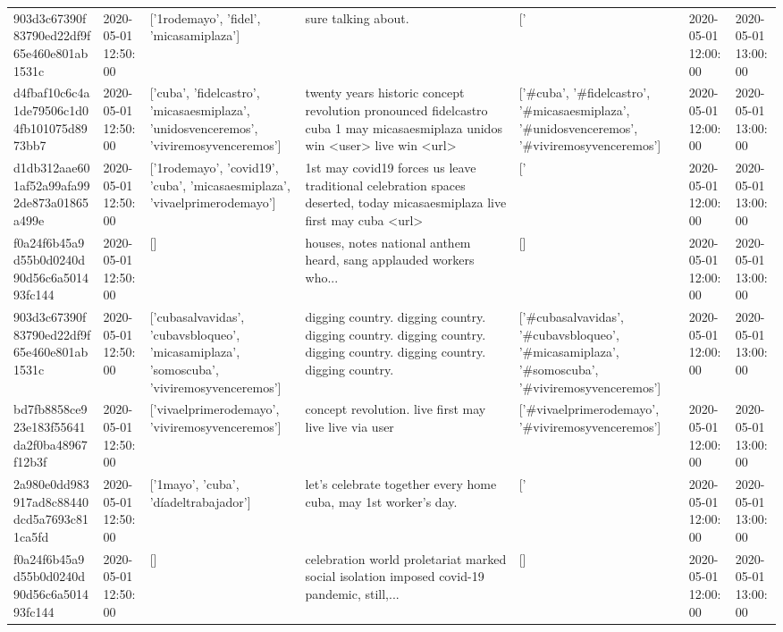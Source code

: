 \begin{tabular}{lllllll}
903d3c67390f83790ed22df9f65e460e801ab1531c & 2020-05-01 12:50:00 & ['1rodemayo', 'fidel', 'micasamiplaza'] & sure talking about. & ['#1rodemayo', '#fidel', '#micasamiplaza'] & 2020-05-01 12:00:00 & 2020-05-01 13:00:00 \\
d4fbaf10c6c4a1de79506c1d04fb101075d8973bb7 & 2020-05-01 12:50:00 & ['cuba', 'fidelcastro', 'micasaesmiplaza', 'unidosvenceremos', 'viviremosyvenceremos'] & twenty years historic concept revolution pronounced fidelcastro cuba 1 may micasaesmiplaza unidos win <user> live win <url> & ['#cuba', '#fidelcastro', '#micasaesmiplaza', '#unidosvenceremos', '#viviremosyvenceremos'] & 2020-05-01 12:00:00 & 2020-05-01 13:00:00 \\
d1db312aae601af52a99afa992de873a01865a499e & 2020-05-01 12:50:00 & ['1rodemayo', 'covid19', 'cuba', 'micasaesmiplaza', 'vivaelprimerodemayo'] & 1st may covid19 forces us leave traditional celebration spaces deserted, today micasaesmiplaza live first may cuba <url> & ['#1rodemayo', '#covid19', '#cuba', '#micasaesmiplaza', '#vivaelprimerodemayo'] & 2020-05-01 12:00:00 & 2020-05-01 13:00:00 \\
f0a24f6b45a9d55b0d0240d90d56c6a501493fc144 & 2020-05-01 12:50:00 & [] & houses, notes national anthem heard, sang applauded workers who... & [] & 2020-05-01 12:00:00 & 2020-05-01 13:00:00 \\
903d3c67390f83790ed22df9f65e460e801ab1531c & 2020-05-01 12:50:00 & ['cubasalvavidas', 'cubavsbloqueo', 'micasamiplaza', 'somoscuba', 'viviremosyvenceremos'] & digging country. digging country. digging country. digging country. digging country. digging country. digging country. & ['#cubasalvavidas', '#cubavsbloqueo', '#micasamiplaza', '#somoscuba', '#viviremosyvenceremos'] & 2020-05-01 12:00:00 & 2020-05-01 13:00:00 \\
bd7fb8858ce923e183f55641da2f0ba48967f12b3f & 2020-05-01 12:50:00 & ['vivaelprimerodemayo', 'viviremosyvenceremos'] & concept revolution. live first may live live via user & ['#vivaelprimerodemayo', '#viviremosyvenceremos'] & 2020-05-01 12:00:00 & 2020-05-01 13:00:00 \\
2a980e0dd983917ad8c88440dcd5a7693c811ca5fd & 2020-05-01 12:50:00 & ['1mayo', 'cuba', 'díadeltrabajador'] & let's celebrate together every home cuba, may 1st worker's day. & ['#1mayo', '#cuba', '#díadeltrabajador'] & 2020-05-01 12:00:00 & 2020-05-01 13:00:00 \\
f0a24f6b45a9d55b0d0240d90d56c6a501493fc144 & 2020-05-01 12:50:00 & [] & celebration world proletariat marked social isolation imposed covid-19 pandemic, still,... & [] & 2020-05-01 12:00:00 & 2020-05-01 13:00:00 \\

\end{tabular}
